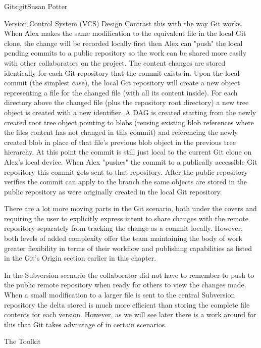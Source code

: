 \begin{aosachapter}{Git}{s:git}{Susan Potter}
\begin{aosasect1}{Version Control System (VCS) Design}
Contrast this with the way Git works.
When Alex makes the same modification to the equivalent file in the local
Git clone, the change will be recorded locally first then Alex can "push"
the local pending commits to a public repository so the work can be shared
more easily with other collaborators on the project. The content changes are
stored identically for each Git repository that the commit exists in. Upon
the local commit (the simplest case), the local Git repository will create a
new object representing a file for the changed file (with all its content
inside). For each directory above the changed file (plus the repository
root directory) a new tree object is created with a new identifier. A DAG
is created starting from the newly created root tree object pointing to
blobs (reusing existing blob references where the files content has not
changed in this commit) and referencing the newly created blob in place
of that file's previous blob object in the previous tree hierarchy. At this
point the commit is still just local to the current Git clone on Alex's
local device. When Alex "pushes" the commit to a publically accessible
Git repository this commit gets sent to that repository. After the public
repository verifies the commit can apply to the branch the same objects
are stored in the public repository as were originally created in the
local Git repository.

There are a lot more moving parts in the Git scenario, both under the
covers and requiring the user to explicitly express intent to share
changes with the remote repository separately from tracking the change as a
commit locally. However, both levels of added complexity offer the team
maintaining the body of work greater flexibility in terms of their
workflow and publishing capabilities as listed in the Git's Origin section
earlier in this chapter.

In the Subversion scenario the collaborator did not have to remember
to push to the public remote repository when ready for others to
view the changes made. When a small modification to a larger file is sent
to the central Subversion repository the delta stored is much more
efficient than storing the complete file contents for each version.
However, as we will see later there is a work around for this that Git
takes advantage of in certain scenarios.

\end{aosasect1}

\begin{aosasect1}{The Toolkit}


\end{aosasect1}
\end{aosachapter}
